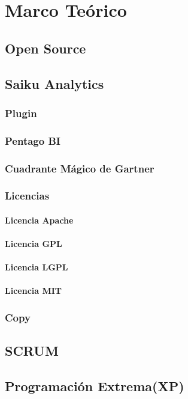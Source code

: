 \chapter{Marco Teórico} \label{chapter:II}
\section{Open Source}
\section{Saiku Analytics}
	\subsection{Plugin}
	\subsection{Pentago BI}
	\subsection{Cuadrante M\'{a}gico de Gartner}
	\subsection{Licencias}
		\subsubsection{Licencia Apache}
		\subsubsection{Licencia GPL}
		\subsubsection{Licencia LGPL}
		\subsubsection{Licencia MIT}
	\subsection{Copy}
\section{SCRUM}	
\section{Programaci\'{o}n Extrema(XP)}

